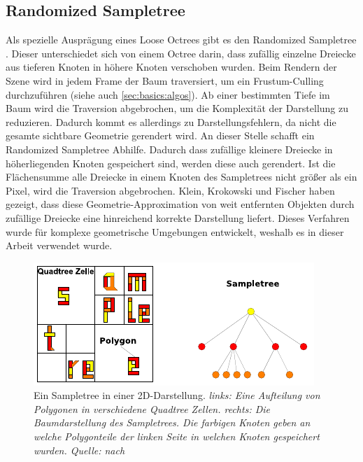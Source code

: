 \subsection{Randomized Sampletree}
\label{sec:basics:sampletree}
Als spezielle Ausprägung eines Loose Octrees gibt es den Randomized Sampletree \cite{klein}. Dieser unterschiedet sich von einem Octree darin, dass zufällig einzelne Dreiecke aus tieferen Knoten in höhere Knoten verschoben  wurden. Beim Rendern der Szene wird in jedem Frame der Baum traversiert, um ein Frustum-Culling durchzuführen (siehe auch \ref{sec:basics:algos}). Ab einer bestimmten Tiefe im Baum wird die Traversion abgebrochen, um die Komplexität der Darstellung zu reduzieren. Dadurch kommt es allerdings zu Darstellungsfehlern, da nicht die gesamte sichtbare Geometrie gerendert wird. An dieser Stelle schafft ein Randomized Sampletree Abhilfe. Dadurch dass zufällige kleinere Dreiecke in höherliegenden Knoten gespeichert sind, werden diese auch gerendert. Ist die Flächensumme alle Dreiecke in einem Knoten des Sampletrees nicht größer als ein Pixel, wird die Traversion abgebrochen. Klein, Krokowski und Fischer \cite{klein} haben gezeigt, dass diese Geometrie-Approximation von weit entfernten Objekten durch zufällige Dreiecke eine hinreichend korrekte Darstellung liefert. Dieses Verfahren wurde für komplexe geometrische Umgebungen entwickelt, weshalb es in dieser Arbeit verwendet wurde.
\begin{figure}
 \centering
  \includegraphics[scale=1.7]{images/sampletree2.pdf}
  \caption{Ein Sampletree in einer 2D-Darstellung. \textit{links: Eine Aufteilung von Polygonen in verschiedene Quadtree Zellen. rechts: Die Baumdarstellung des Sampletrees. Die farbigen Knoten geben an welche Polygonteile der linken Seite in welchen Knoten gespeichert wurden. Quelle: nach \cite{klein}}}
 \label{fig:basics:sampletree}
\end{figure}


